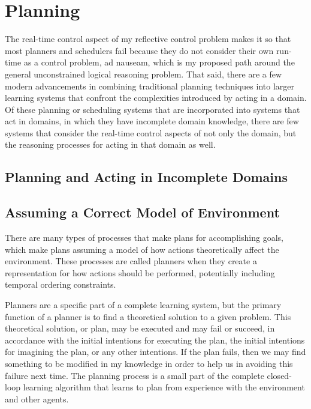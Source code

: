 \citep[p.~78]{minsky:1988}



\section{Planning}

The real-time control aspect of my reflective control problem makes it
so that most planners and schedulers fail because they do not consider
their own run-time as a control problem, ad nauseam, which is my
proposed path around the general unconstrained logical reasoning
problem.  That said, there are a few modern advancements in combining
traditional planning techniques into larger learning systems that
confront the complexities introduced by acting in a domain.  Of these
planning or scheduling systems that are incorporated into systems that
act in domains, in which they have incomplete domain knowledge, there
are few systems that consider the real-time control aspects of not
only the domain, but the reasoning processes for acting in that domain
as well.

\subsection{Planning and Acting in Incomplete Domains}

\citep{weber:2011}


\subsection{Assuming a Correct Model of Environment}

There are many types of processes that make plans for accomplishing
goals, which make plans assuming a model of how actions theoretically
affect the environment.  These processes are called planners when they
create a representation for how actions should be performed,
potentially including temporal ordering constraints.

Planners are a specific part of a complete learning system, but the
primary function of a planner is to find a theoretical solution to a
given problem.  This theoretical solution, or plan, may be executed
and may fail or succeed, in accordance with the initial intentions for
executing the plan, the initial intentions for imagining the plan, or
any other intentions.  If the plan fails, then we may find something
to be modified in my knowledge in order to help us in avoiding this
failure next time.  The planning process is a small part of the
complete closed-loop learning algorithm that learns to plan from
experience with the environment and other agents.



